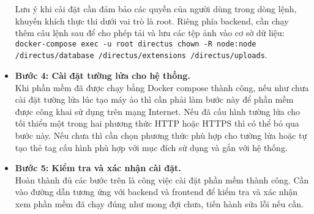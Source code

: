 \documentclass[./../main.tex]{subfiles}
\begin{document}
\begin{itemize}
    Lưu ý khi cài đặt cần đảm bảo các quyền của người dùng trong dòng lệnh, khuyến khích thực thi dưới vai trò là root. Riêng phía backend, cần chạy thêm câu lệnh sau để cho phép tải và lưu các tệp ảnh vào cơ sở dữ liệu: \texttt{docker-compose exec -u root directus chown -R node:node /directus/database /directus/extensions /directus/uploads}.
    \item \textbf{Bước 4: Cài đặt tường lửa cho hệ thống.}\\
    Khi phần mềm đã được chạy bằng Docker compose thành công, nếu như chưa cài đặt tường lửa lúc tạo máy ảo thì cần phải làm bước này để phần mềm được công khai sử dụng trên mạng Internet. Nếu đã cấu hình tường lửa cho tối thiểu một trong hai phương thức HTTP hoặc HTTPS thì có thể bỏ qua bước này. Nếu chưa thì cần chọn phương thức phù hợp cho tường lửa hoặc tự tạo thẻ tag cấu hình phù hợp với mục đích sử dụng và gắn với hệ thống.
    \item \textbf{Bước 5: Kiểm tra và xác nhận cài đặt.}\\
    Hoàn thành đủ các bước trên là công việc cài đặt phần mềm thành công. Cần vào đường dẫn tương ứng với backend và frontend để kiểm tra và xác nhận xem phần mềm đã chạy đúng như mong đợi chưa, tiến hành sửa lỗi nếu cần.
\end{itemize}

\end{document}
